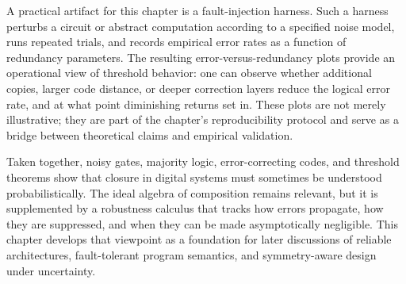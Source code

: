 \documentclass[11pt]{article}
\begin{document}
A practical artifact for this chapter is a fault-injection harness. Such a harness perturbs a circuit or abstract computation according to a specified noise model, runs repeated trials, and records empirical error rates as a function of redundancy parameters. The resulting error-versus-redundancy plots provide an operational view of threshold behavior: one can observe whether additional copies, larger code distance, or deeper correction layers reduce the logical error rate, and at what point diminishing returns set in. These plots are not merely illustrative; they are part of the chapter's reproducibility protocol and serve as a bridge between theoretical claims and empirical validation.

Taken together, noisy gates, majority logic, error-correcting codes, and threshold theorems show that closure in digital systems must sometimes be understood probabilistically. The ideal algebra of composition remains relevant, but it is supplemented by a robustness calculus that tracks how errors propagate, how they are suppressed, and when they can be made asymptotically negligible. This chapter develops that viewpoint as a foundation for later discussions of reliable architectures, fault-tolerant program semantics, and symmetry-aware design under uncertainty.
\end{document}
